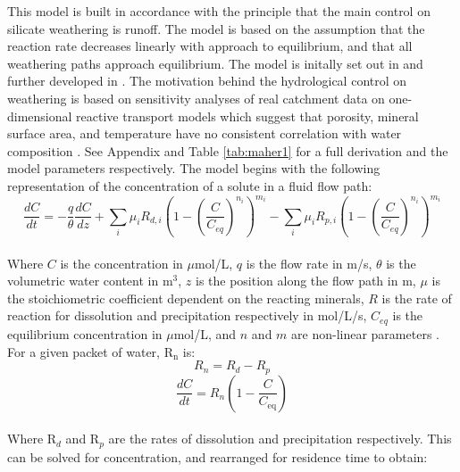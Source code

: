 This model is built in accordance with the principle that the main control on silicate weathering is runoff. The model is based on the assumption that the reaction rate decreases linearly with approach to equilibrium, and that all weathering paths approach equilibrium. The model is initally set out in \textcite{maherRoleFluidResidence2011} and further developed in \textcite{maherHydrologicRegulationChemical2014}. The motivation behind the hydrological control on weathering is based on sensitivity analyses of real catchment data on one-dimensional reactive transport models which suggest that porosity, mineral surface area, and temperature have no consistent correlation with water composition \parencite{maherRoleFluidResidence2011}. See Appendix and Table \ref{tab:maher1} for a full derivation and the model parameters respectively. The model begins with the following representation of the concentration of a solute in a fluid flow path:\\ 

\begin{equation}
    \frac{dC}{dt} = -\frac{q}{\theta} \frac{dC}{dz} + \sum_i \mu_i R_{d,i} \left( 1 - \left( \frac{C}{C_{eq}} \right)^{n_i} \right)^{m_i} - \sum_i \mu_i R_{p,i} \left( 1 - \left( \frac{C}{C_{eq}} \right)^{n_i} \right)^{m_i}
    \label{eq:maher}
\end{equation}\\

Where \( C \) is the concentration in $\mu$mol/L, \( q \) is the flow rate in m/s, \( \theta \) is the volumetric water content in m$^3$, \( z \) is the position along the flow path in m, \( \mu \) is the stoichiometric coefficient dependent on the reacting minerals, \( R \) is the rate of reaction for dissolution and precipitation respectively in mol/L/s, \( C_{eq} \) is the equilibrium concentration in $\mu$mol/L, and \( n \) and \( m \) are non-linear parameters \parencite{maherRoleFluidResidence2011}. For a given packet of water, R$_{\text{n}}$ is: \\

\begin{equation}
R_n = R_{d} - R_{p}
\end{equation} 
\begin{equation}
\frac{dC}{dt} = R_n \left( 1 - \frac{C}{C_{\text{eq}}} \right)
\end{equation} \\

Where R$_d$ and R$_p$ are the rates of dissolution and precipitation respectively. This can be solved for concentration, and rearranged for residence time to obtain:

